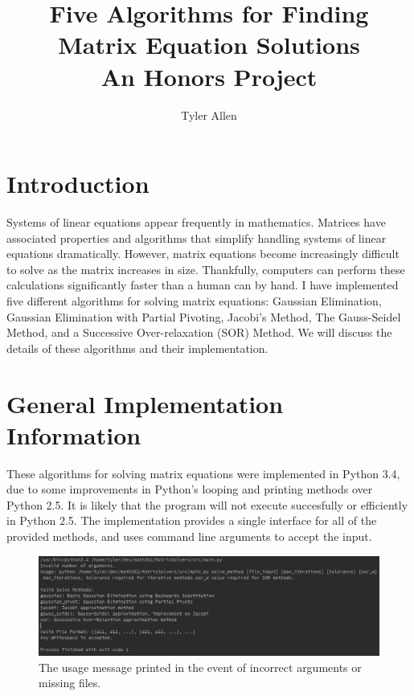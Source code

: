 \documentclass[12pt]{article}
\begin{document}
\title{Five Algorithms for Finding Matrix Equation Solutions\\An Honors Project}
\author{Tyler Allen}
\date{}

\maketitle
\newpage
\section{Introduction}

Systems of linear equations appear frequently in mathematics. Matrices have 
associated properties and algorithms that simplify handling systems of linear
equations dramatically. However, matrix equations become increasingly difficult to 
solve as the matrix increases in size. Thankfully, computers can perform these calculations
significantly faster than a human can by hand. I have implemented five different
algorithms for solving matrix equations: Gaussian Elimination, Gaussian Elimination with
Partial Pivoting, Jacobi's Method, The Gauss-Seidel Method, and a 
Successive Over-relaxation (SOR) Method. We will discuss the details of these 
algorithms and their implementation.



\section{General Implementation Information}
These algorithms for solving matrix equations  were implemented in Python 3.4, due to some improvements 
in Python's looping and printing methods over Python 2.5. It is likely that the
program will not execute succesfully or efficiently in Python 2.5. The implementation
provides a single interface for all of the provided methods, and uses command line 
arguments to accept the input. 

\begin{figure}[H]
\begin{center}
\includegraphics[scale=.4]{usage.png}
\caption{The usage message printed in the event of incorrect arguments or missing files.}
\label{usage}
\end{center}
\end{figure}
\end{document}
